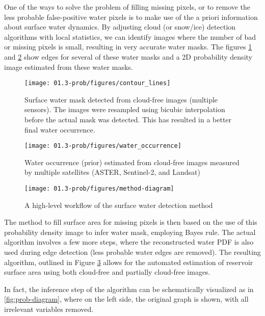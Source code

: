One of the ways to solve the problem of filling missing pixels, or to remove the less probable false-positive water pixels is to make use of the a priori information about surface water dynamics. By adjusting cloud (or snow/ice) detection algorithms with local statistics, we can identify images where the number of bad or missing pixels is small, resulting in very accurate water masks. The figures \ref{fig:prob-water-isolines} and \ref{fig:prob-water-density} show edges for several of these water masks and a 2D probability density image estimated from these water masks.

\begin{figure}[H]
	\centering
	\texttt{[image: 01.3-prob/figures/contour\_lines]}
	\caption{Surface water mask detected from cloud-free images (multiple sensors). The images were resampled using bicubic interpolation before the actual mask was detected. This has resulted in a better final water occurrence.}
	\label{fig:prob-water-isolines}
\end{figure}


\begin{figure}[H]
	\centering
	\texttt{[image: 01.3-prob/figures/water\_occurrence]}
	\caption{Water occurrence (prior) estimated from cloud-free images measured by multiple satellites (ASTER, Sentinel-2, and Landsat)}
	\label{fig:prob-water-density}
\end{figure}

\begin{figure}[H]
	\centering
	\texttt{[image: 01.3-prob/figures/method-diagram]}
	\caption{A high-level workflow of the surface water detection method}
	\label{fig:prob-workflow}
\end{figure}

The method to fill surface area for missing pixels is then based on the use of this probability density image to infer water mask, employing Bayes rule. The actual algorithm involves a few more steps, where the reconstructed water PDF is also used during edge detection (less probable water edges are removed). The resulting algorithm, outlined in Figure \ref{fig:prob-workflow} allows for the automated estimation of reservoir surface area using both cloud-free and partially cloud-free images. 

In fact, the inference step of the algorithm can be schematically visualized as in \ref{fig:prob-diagram}, where on the left side, the original graph is shown, with all irrelevant variables removed. 

